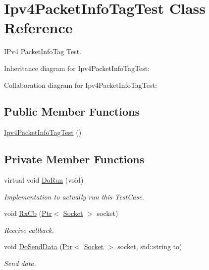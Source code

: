 \hypertarget{classIpv4PacketInfoTagTest}{}\section{Ipv4\+Packet\+Info\+Tag\+Test Class Reference}
\label{classIpv4PacketInfoTagTest}


I\+Pv4 Packet\+Info\+Tag Test.  




Inheritance diagram for Ipv4\+Packet\+Info\+Tag\+Test\+:


Collaboration diagram for Ipv4\+Packet\+Info\+Tag\+Test\+:
\subsection*{Public Member Functions}
\begin{DoxyCompactItemize}
\item 
\hyperlink{classIpv4PacketInfoTagTest_aad133aba023c62f3aca9e29f2d8bf201}{Ipv4\+Packet\+Info\+Tag\+Test} ()
\end{DoxyCompactItemize}
\subsection*{Private Member Functions}
\begin{DoxyCompactItemize}
\item 
virtual void \hyperlink{classIpv4PacketInfoTagTest_a76ce4d3cfa6dc21bd2a982ba2e5d4386}{Do\+Run} (void)
\begin{DoxyCompactList}\small\item\em Implementation to actually run this Test\+Case. \end{DoxyCompactList}\item 
void \hyperlink{classIpv4PacketInfoTagTest_ac528deb0c346c973c2e5391540a53bc3}{Rx\+Cb} (\hyperlink{classns3_1_1Ptr}{Ptr}$<$ \hyperlink{classns3_1_1Socket}{Socket} $>$ socket)
\begin{DoxyCompactList}\small\item\em Receive callback. \end{DoxyCompactList}\item 
void \hyperlink{classIpv4PacketInfoTagTest_a5cba94d15d8c0921a95a3769c06221b7}{Do\+Send\+Data} (\hyperlink{classns3_1_1Ptr}{Ptr}$<$ \hyperlink{classns3_1_1Socket}{Socket} $>$ socket, std\+::string to)
\begin{DoxyCompactList}\small\item\em Send data. \end{DoxyCompactList}\end{DoxyCompactItemize}
